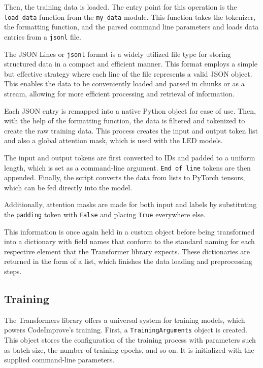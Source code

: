         Then, the training data is loaded. The entry point for this operation is the \texttt{load\_data} function from the \texttt{my\_data} module. This function takes the tokenizer, the formatting function, and the parsed command line parameters and loads data entries from a \texttt{jsonl} file.
        
        \medskip
        
        The JSON Lines or \texttt{jsonl} format is a widely utilized file type for storing structured data in a compact and efficient manner. This format employs a simple but effective strategy where each line of the file represents a valid JSON object. This enables the data to be conveniently loaded and parsed in chunks or as a stream, allowing for more efficient processing and retrieval of information. 
        
        Each JSON entry is remapped into a native Python object for ease of use. Then, with the help of the formatting function, the data is filtered and tokenized to create the raw training data. This process creates the input and output token list and also a global attention mask, which is used with the LED models.
        
        The input and output tokens are first converted to IDs and padded to a uniform length, which is set as a command-line argument. \texttt{End of line} tokens are then appended. Finally, the script converts the data from lists to PyTorch tensors, which can be fed directly into the model.
        
        Additionally, attention masks are made for both input and labels by substituting the \texttt{padding} token with \texttt{False} and placing \texttt{True} everywhere else.
        
        This information is once again held in a custom object before being transformed into a dictionary with field names that conform to the standard naming for each respective element that the Transformer library expects. These dictionaries are returned in the form of a list, which finishes the data loading and preprocessing steps.
        
        \subsection{Training}
        The Transformers library offers a universal system for training models, which powers CodeImprove's training. First, a \texttt{TrainingArguments} object is created. This object stores the configuration of the training process with parameters such as batch size, the number of training epochs, and so on. It is initialized with the supplied command-line parameters.

